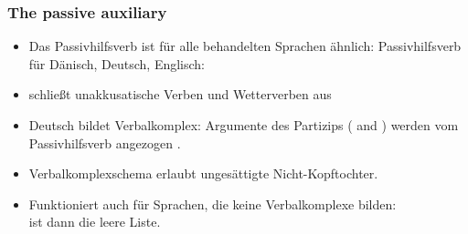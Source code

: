 
\subsubsection{The passive auxiliary}
\label{sec-auxiliary}



\begin{itemize}
\item Das Passivhilfsverb ist für alle behandelten Sprachen ähnlich:
\ea
Passivhilfsverb für Dänisch, Deutsch, Englisch:
\z


\item \daw schließt unakkusatische Verben und Wetterverben aus


\item Deutsch bildet Verbalkomplex: Argumente des Partizips ( and ) werden vom
  Passivhilfsverb angezogen \citep{HN89a}. 


\item Verbalkomplexschema erlaubt ungesättigte Nicht-Kopftochter.


\item Funktioniert auch für Sprachen, die keine Verbalkomplexe bilden:\\
 ist dann die leere Liste. 


\end{itemize}









